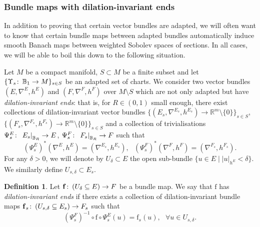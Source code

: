 \documentclass{article}
\numberwithin{equation}{section}        %
\theoremstyle{bfnote}
\theoremstyle{definition}
\newtheorem{Def}[thm]{Definition}           %
\theoremstyle{bfremark}
\newcommand{\col}{\colon \thinspace}        %
\newcommand{\R}{\mathbb{R}}                 %
\newcommand{\Ball}{\mathbb{B}}              %
\newcommand{\bmap}[1]{\boldsymbol{\mathrm{#1}}}     %
\begin{document}
	\subsubsection{Bundle maps with dilation-invariant ends}       \label{subsubsec: Bundle maps with dilation-invariant ends}

In addition to proving that certain vector bundles are adapted, we will often want to know that certain bundle maps between adapted bundles automatically induce smooth Banach maps between weighted Sobolev spaces of sections. In all cases, we will be able to boil this down to the following situation. 

Let $M$ be a compact manifold, $S \subset M$ be a finite subset and let $\{ \Upsilon_s \col \Ball_1 \to M\}_{s \in S}$ be an adapted set of charts. We consider two vector bundles $(E,\nabla^E,h^E)$ and $(F,\nabla^F,h^F)$ over $M \setminus S$ which are not only adapted but have \emph{dilation-invariant ends}: that is, for $R \in (0,1)$ small enough, there exist collections of dilation-invariant vector bundles $\{(E_s,\nabla^{E_s},h^{E_s}) \to \R^m \setminus \{0\}\}_{s \in S}$, $\{(F_s,\nabla^{F_s},h^{F_s}) \to \R^m \setminus \{0\}\}_{s \in S}$ and a collection of trivialisations $\Psi^E_s \col \left. E_s \right|_{\Ball_R} \to E$, $\Psi^F_s \col \left. F_s \right|_{\Ball_R} \to F$ such that
\begin{equation*}
    (\Psi^E_s)^* (\nabla^E,h^{E}) = (\nabla^{E_s},h^{E_s}), ~~~ (\Psi^F_s)^* (\nabla^F,h^F) = (\nabla^{F_s},h^{F_s}).
\end{equation*}
For any $\delta > 0$, we will denote by $U_\delta \subset E$ the open sub-bundle $\{ u \in E \mid |u|_{h^E} < \delta \}$. We similarly define $U_{s,\delta} \subset E_s$.

\begin{Def}		\label{Def: non-linear bundle map with dilation invariant ends}
    Let $\bmap{f} \col (U_\delta \subseteq E) \to F$ be a bundle map. We say that $\bmap{f}$ has \emph{dilation-invariant ends} if there exists a collection of dilation-invariant bundle maps $\bmap{f}_s \col (U_{s,\delta} \subseteq E_s) \to F_s$ such that 
    \begin{equation*}
        (\Psi_s^F)^{-1} \circ \bmap{f} \circ \Psi_s^E (u) = \bmap{f}_s(u), ~~~ \forall u \in U_{s,\delta} .
    \end{equation*}
\end{Def}
\end{document}

